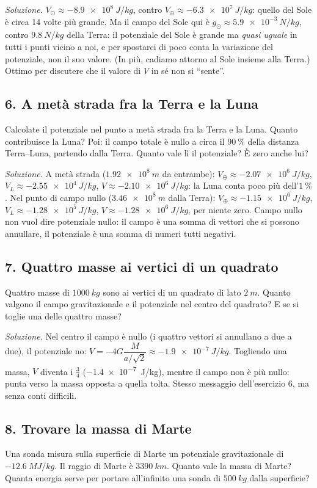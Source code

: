 \documentclass[11pt]{report}
\begin{document}
\emph{Soluzione.} $V_\odot \approx \SI{-8.9e8}{J/kg}$, contro
$V_\oplus \approx \SI{-6.3e7}{J/kg}$: quello del Sole è circa 14 volte più
grande. Ma il campo del Sole qui è $g_\odot \approx \SI{5.9e-3}{N/kg}$,
contro $\SI{9.8}{N/kg}$ della Terra: il potenziale del Sole è grande ma
\emph{quasi uguale} in tutti i punti vicino a noi, e per spostarci di poco
conta la variazione del potenziale, non il suo valore. (In più, cadiamo
attorno al Sole insieme alla Terra.) Ottimo per discutere che il valore di
$V$ in sé non si ``sente''.

\subsection*{6. A metà strada fra la Terra e la Luna}
Calcolate il potenziale nel punto a metà strada fra la Terra e la Luna.
Quanto contribuisce la Luna? Poi: il campo totale è nullo a circa il
$\SI{90}{\%}$ della distanza Terra--Luna, partendo dalla Terra. Quanto vale
lì il potenziale? È zero anche lui?

\emph{Soluzione.} A metà strada ($\SI{1.92e8}{m}$ da entrambe):
$V_\oplus \approx \SI{-2.07e6}{J/kg}$, $V_L \approx \SI{-2.55e4}{J/kg}$,
$V \approx \SI{-2.10e6}{J/kg}$: la Luna conta poco più dell'$\SI{1}{\%}$.
Nel punto di campo nullo ($\SI{3.46e8}{m}$ dalla Terra):
$V_\oplus \approx \SI{-1.15e6}{J/kg}$, $V_L \approx \SI{-1.28e5}{J/kg}$,
$V \approx \SI{-1.28e6}{J/kg}$, per niente zero. Campo nullo non vuol dire
potenziale nullo: il campo è una somma di vettori che si possono annullare,
il potenziale è una somma di numeri tutti negativi.

\subsection*{7. Quattro masse ai vertici di un quadrato}
Quattro masse di $\SI{1000}{kg}$ sono ai vertici di un quadrato di lato
$\SI{2}{m}$. Quanto valgono il campo gravitazionale e il potenziale nel
centro del quadrato? E se si toglie una delle quattro masse?

\emph{Soluzione.} Nel centro il campo è nullo (i quattro vettori si
annullano a due a due), il potenziale no:
$V = -4G\dfrac{M}{a/\sqrt2} \approx \SI{-1.9e-7}{J/kg}$. Togliendo una massa,
$V$ diventa i $\tfrac34$ (\SI{-1.4e-7}{J/kg}), mentre il campo non è più
nullo: punta verso la massa opposta a quella tolta. Stesso messaggio
dell'esercizio 6, ma senza conti difficili.

\subsection*{8. Trovare la massa di Marte}
Una sonda misura sulla superficie di Marte un potenziale gravitazionale di
$\SI{-12.6}{MJ/kg}$. Il raggio di Marte è $\SI{3390}{km}$. Quanto vale la
massa di Marte? Quanta energia serve per portare all'infinito una sonda di
$\SI{500}{kg}$ dalla superficie?
\end{document}
